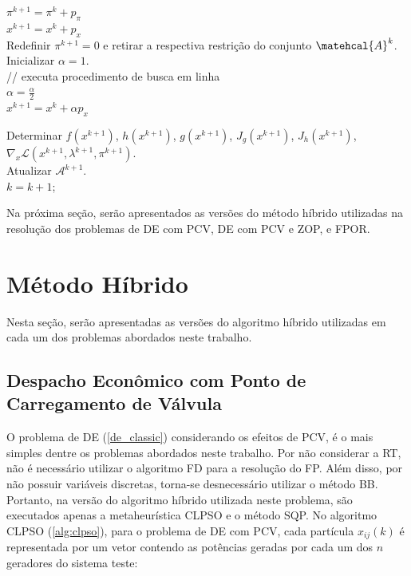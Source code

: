 \documentclass[
	12pt,				%
	openany,			%
	twoside,			%
	a4paper,			%
	chapter=TITLE,		%
	section=Title,		%
	subsection=Title,	%
	subsubsection=Title,%
	english,			%
	french,				%
	spanish,			%
	brazil			%
	]{abntex2}
\begin{document}
\begin{ERRATA}
\begin{algorithm}[!h]
{{$\pi^{k+1} = \pi^{k} + p_\pi$\\

$x^{k+1} = x^{k} + p_x$\\

{ Redefinir $\pi^{k+1}=0$ e retirar a respectiva restrição do conjunto $\matehcal{A}^k$.}
Inicializar $\alpha = 1$.\\
{// executa procedimento de busca em linha\\
$\alpha = \frac{\alpha}{2}$\\
$x^{k+1} = x^{k} + \alpha p_x$\\
}

Determinar $f(x^{k+1})$, $h(x^{k+1})$, $g(x^{k+1})$, $J_g(x^{k+1})$, $J_h(x^{k+1})$, $\nabla_x \mathcal{L}(x^{k+1}, \lambda^{k+1}, \pi^{k+1})$.\\
Atualizar $\mathcal{A}^{k+1}$.\\

$k=k+1$;
}
}
\end{algorithm}


Na próxima seção, serão apresentados as versões do método híbrido utilizadas na resolução dos problemas de DE com PCV, DE com PCV e ZOP, e FPOR.

\pagebreak
\section{Método Híbrido}

Nesta seção, serão apresentadas as versões do algoritmo híbrido utilizadas em cada um dos problemas abordados neste trabalho.

\subsection{Despacho Econômico com Ponto de Carregamento de Válvula}

O problema de DE (\ref{de_classic}) considerando os efeitos de PCV, é o mais simples dentre os problemas abordados neste trabalho. Por não considerar a RT, não é necessário utilizar o algoritmo FD para a resolução do FP. Além disso, por não possuir variáveis discretas, torna-se desnecessário utilizar o método BB. Portanto, na versão do algoritmo híbrido utilizada neste problema, são executados apenas a metaheurística CLPSO e o método SQP. No algoritmo CLPSO (\ref{alg:clpso}), para o problema de DE com PCV, cada partícula $x_{ij}(k)$ é representada por um vetor contendo as potências geradas por cada um dos $n$ geradores do sistema teste:


\end{ERRATA}
\end{document}
